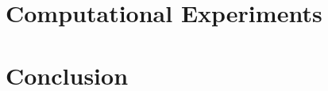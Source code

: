 \documentclass[smallextended]{svjour3}       %
\begin{document}
\section{Computational Experiments}\label{sec:results}


\section{Conclusion}\label{sec:conclusion}


% 
% 
%
% 
% 
% 


%
%


\end{document}
